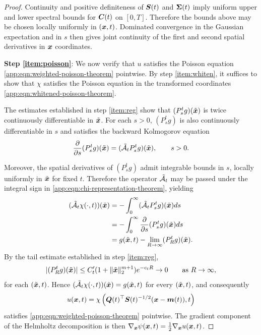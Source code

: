 \begin{proof}
Continuity and positive definiteness of $\boldsymbol{S}(t)$ and $\boldsymbol{\Sigma}(t)$ imply uniform upper and lower spectral bounds for $\boldsymbol{C}(t)$ on $[0,T]$. Therefore the bounds above may be chosen locally uniformly in $(\boldsymbol{x},t)$. Dominated convergence in the Gaussian expectation and in $s$ then gives joint continuity of the first and second spatial derivatives in $\boldsymbol{x}$ coordinates.

\medskip
\textbf{Step \ref{item:poisson}}:
We now verify that $u$ satisfies the Poisson equation \cref{app:eqn:weighted-poisson-theorem} pointwise.
By step \ref{item:whiten}, it suffices to show that $\chi$ satisfies the Poisson equation in the transformed coordinates \eqref{app:eqn:whitened-poisson-theorem}.

The estimates established in step \ref{item:reg} show that $(P_s^t g)(\tilde{\boldsymbol{x}})$ is twice continuously differentiable in $\tilde{\boldsymbol{x}}$.
For each $s>0$, $(P_s^t g)$ is also continuously differentiable in $s$ and satisfies the backward Kolmogorov equation
\begin{equation*}
    \frac{\partial}{\partial s}(P_s^t g)(\tilde{\boldsymbol{x}}) = (\tilde{\mathcal{A}}_t P_s^t g)(\tilde{\boldsymbol{x}}), \qquad s>0.
\end{equation*}

Moreover, the spatial derivatives of $(P_s^t g)$ admit integrable bounds in $s$, locally uniformly in $\tilde{\boldsymbol{x}}$ for fixed $t$.
Therefore the operator $\tilde{\mathcal{A}}_t$ may be passed under the integral sign in \cref{app:eqn:chi-representation-theorem}, yielding
\begin{equation*}
\begin{aligned}
    (\tilde{\mathcal{A}}_t \chi(\cdot,t))(\tilde{\boldsymbol{x}}) &= -\int_0^\infty (\tilde{\mathcal{A}}_t P_s^t g)(\tilde{\boldsymbol{x}})ds\\
    &= -\int_0^\infty \frac{\partial}{\partial s}(P_s^t g)(\tilde{\boldsymbol{x}})ds\\
    &= g(\tilde{\boldsymbol{x}},t)-\lim_{R\to\infty}(P_R^t g)(\tilde{\boldsymbol{x}}).
\end{aligned}
\end{equation*}
By the tail estimate established in step \ref{item:reg},
\begin{equation*}
    |(P_R^t g)(\tilde{\boldsymbol{x}})| \leq C_t'(1+\|\tilde{\boldsymbol{x}}\|_2^{m+1})e^{-c_tR} \to 0 \qquad\text{as }R\to\infty,
\end{equation*}
for each $(\tilde{\boldsymbol{x}},t)$.
Hence $(\tilde{\mathcal{A}}_t\chi(\cdot,t))(\tilde{\boldsymbol{x}})=g(\tilde{\boldsymbol{x}},t)$ for every $(\tilde{\boldsymbol{x}},t)$, and consequently
\begin{equation*}
    u(\boldsymbol{x},t) = \chi\left( \boldsymbol{Q}(t)^\top\boldsymbol{S}(t)^{-1/2}(\boldsymbol{x}-\boldsymbol{m}(t)),t \right)
\end{equation*}
satisfies \cref{app:eqn:weighted-poisson-theorem} pointwise. The gradient component of the Helmholtz decomposition is then $\nabla_{\boldsymbol{x}}\psi(\boldsymbol{x},t)=\tfrac{1}{2}\nabla_{\boldsymbol{x}}u(\boldsymbol{x},t)$.


\end{proof}
